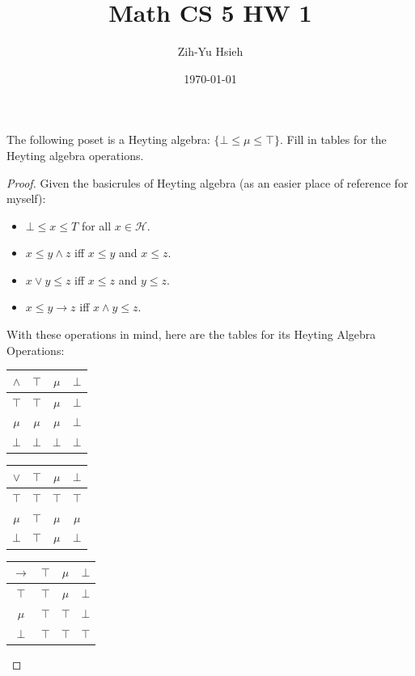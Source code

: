 \documentclass{article}
\title{Math CS 5 HW 1}
\author{Zih-Yu Hsieh}
\date{\today}
\begin{document}
\maketitle

\begin{ques}\label{q1}
    The following poset is a Heyting algebra: $\{\bot\leq \mu\leq \top\}$. Fill in tables for the Heyting algebra operations.
\end{ques}

\begin{proof}
    Given the basicrules of Heyting algebra (as an easier place of reference for myself):
    \begin{itemize}
        \item $\bot\leq x\leq T$ for all $x\in \mathcal{H}$.
        \item $x\leq y\wedge z$ iff $x\leq y$ and $x\leq z$.
        \item $x\vee y\leq z$ iff $x\leq z$ and $y\leq z$.
        \item $x\leq y\rightarrow z$ iff $x\wedge y\leq z$.
    \end{itemize}
    With these operations in mind, here are the tables for its Heyting Algebra Operations:
    \begin{center}
    \begin{tabular}{ c|c|c|c| } 
        $\wedge$ & $\top$ & $\mu$ &$\bot$\\
        \hline
        $\top$ & $\top$ & $\mu$ & $\bot$ \\ 
        \hline
        $\mu$ & $\mu$ & $\mu$ & $\bot$ \\ 
        \hline
        $\bot$ & $\bot$ & $\bot$ & $\bot$ \\ 
        \hline
    \end{tabular}
    \hfil
    \begin{tabular}{ c|c|c|c| } 
        $\vee$ & $\top$ & $\mu$ &$\bot$\\
        \hline
        $\top$ & $\top$ & $\top$ & $\top$ \\ 
        \hline
        $\mu$ & $\top$ & $\mu$ & $\mu$ \\ 
        \hline
        $\bot$ & $\top$ & $\mu$ & $\bot$ \\ 
        \hline
    \end{tabular}
    \hfil
    \begin{tabular}{ c|c|c|c| } 
        $\rightarrow$ & $\top$ & $\mu$ &$\bot$\\
        \hline
        $\top$ & $\top$ & $\mu$ & $\bot$ \\ 
        \hline
        $\mu$ & $\top$ & $\top$ & $\bot$ \\ 
        \hline
        $\bot$ & $\top$ & $\top$ & $\top$ \\ 
        \hline
    \end{tabular}
    \end{center}
    
\end{proof}
\end{document}
